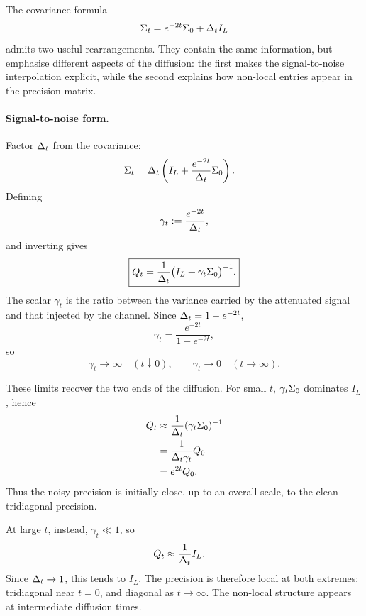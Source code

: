 The covariance formula
\[
  \Sigma_t
  =
  e^{-2t}\Sigma_0+\Delta_t I_L
\]
admits two useful rearrangements. They contain the same information, but
emphasise different aspects of the diffusion: the first makes the
signal-to-noise interpolation explicit, while the second explains how
non-local entries appear in the precision matrix.

\paragraph{Signal-to-noise form.}
Factor $\Delta_t$ from the covariance:
\begin{align}
  \Sigma_t
  &=
  \Delta_t
  \left(
    I_L+\frac{e^{-2t}}{\Delta_t}\Sigma_0
  \right).
\end{align}
Defining
\begin{equation}
  \gamma_t
  :=
  \frac{e^{-2t}}{\Delta_t},
  \label{eq:g-gamma-def}
\end{equation}
and inverting gives
\begin{equation}
  \boxed{
  Q_t
  =
  \frac{1}{\Delta_t}
  \bigl(I_L+\gamma_t\Sigma_0\bigr)^{-1}.
  }
  \label{eq:g-Qt-snr}
\end{equation}
The scalar $\gamma_t$ is the ratio between the variance carried by the
attenuated signal and that injected by the channel. Since
$\Delta_t=1-e^{-2t}$,
\begin{equation}
  \gamma_t
  =
  \frac{e^{-2t}}{1-e^{-2t}},
\end{equation}
so
\[
  \gamma_t\longrightarrow\infty
  \quad (t\downarrow0),
  \qquad
  \gamma_t\longrightarrow0
  \quad (t\to\infty).
\]

These limits recover the two ends of the diffusion. For small $t$,
$\gamma_t\Sigma_0$ dominates $I_L$, hence
\begin{align}
  Q_t
  &\approx
  \frac{1}{\Delta_t}
  (\gamma_t\Sigma_0)^{-1}\\
  &=
  \frac{1}{\Delta_t\gamma_t}Q_0\\
  &=
  e^{2t}Q_0.
  \label{eq:g-Qt-smallt}
\end{align}
Thus the noisy precision is initially close, up to an overall scale, to the
clean tridiagonal precision.

At large $t$, instead, $\gamma_t\ll1$, so
\begin{align}
  Q_t
  &\approx
  \frac{1}{\Delta_t}I_L.
  \label{eq:g-Qt-larget}
\end{align}
Since $\Delta_t\to1$, this tends to $I_L$. The precision is therefore local at
both extremes: tridiagonal near $t=0$, and diagonal as $t\to\infty$. The
non-local structure appears at intermediate diffusion times.

